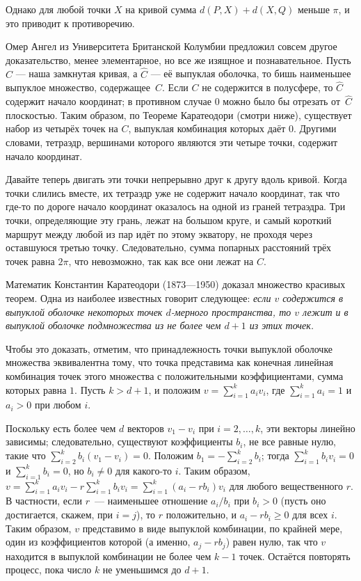 Однако для любой точки $X$ на кривой сумма $d(P, X) + d(X, Q)$ меньше $\pi$, и это приводит к противоречию.

Омер Ангел из Университета Британской Колумбии
предложил совсем другое доказательство,
менее элементарное, но все же изящное и познавательное.
Пусть $C$ --- наша замкнутая кривая, а $\hat C$ --- её выпуклая оболочка, то бишь наименьшее выпуклое множество, содержащее~$C$.
Если $C$ не содержится в полусфере, то $\hat C$ содержит начало координат;
в противном случае $0$ можно было бы отрезать от~$\hat C$ плоскостью.
Таким образом, по Теореме Каратеодори (смотри ниже), существует набор из четырёх точек на $C$, выпуклая комбинация которых даёт $0$.
Другими словами, тетраэдр, вершинами которого являются эти четыре точки, содержит начало координат.

Давайте теперь двигать эти точки непрерывно друг к другу вдоль кривой.
Когда точки слились вместе, их тетраэдр уже не содержит начало координат, так что где-то по дороге начало координат оказалось на одной из граней тетраэдра.
Три точки, определяющие эту грань, лежат на большом круге, и самый короткий маршрут между любой из пар идёт по этому экватору, не проходя через оставшуюся третью точку.
Следовательно, сумма попарных расстояний трёх точек равна $2\pi$, что невозможно, так как все они лежат на $C$.

Математик Константин Каратеодори (1873---1950) доказал множество красивых теорем.
Одна из наиболее известных говорит следующее: \textit{если $v$ содержится в выпуклой оболочке некоторых точек $d$-мерного  пространства, то $v$ лежит и в выпуклой оболочке подмножества из не более чем $d+1$ из этих точек.}

Чтобы это доказать, отметим, что принадлежность точки выпуклой оболочке множества
эквивалентна тому, что точка представима как конечная линейная комбинация точек этого множества с положительными коэффициентами, сумма которых равна $1$.
Пусть $k>d+1$, и положим $v=\sum_{i=1}^k a_iv_i$, где $\sum_{i=1}^k a_i=1$ и $a_i>0$ при любом $i$.

Поскольку есть более чем $d$ векторов $v_1-v_i$ при $i=2,\dots,k$, эти векторы линейно зависимы;
следовательно, существуют коэффициенты $b_i$, не все равные нулю, такие что $\sum_{i=2}^k b_i(v_1-v_i)=0$.
Положим $b_1=-\sum_{i=2}^k b_i$; тогда $\sum_{i=1}^k b_i v_i=0$ и $\sum_{i=1}^k b_i=0$, но $b_i\ne 0$ для какого-то $i$.
Таким образом, $v=\sum_{i=1}^k a_iv_i-r\sum_{i=1}^k b_iv_i=\sum_{i=1}^k (a_i-rb_i)v_i$ для любого вещественного $r$.
В частности, если $r$~--- наименьшее отношение $a_i/b_i$  при $b_i>0$ (пусть оно достигается, скажем, при $i=j$), то $r$ положительно, и $a_i-rb_i\ge0$ для всех $i$.
Таким образом, $v$ представимо в виде выпуклой комбинации, по крайней мере, один из коэффициентов которой (а именно, $a_j-rb_j$) равен нулю, так что $v$ находится в выпуклой комбинации не более чем $k-1$ точек.
Остаётся повторять процесс, пока число $k$ не уменьшимся до $d+1$.

